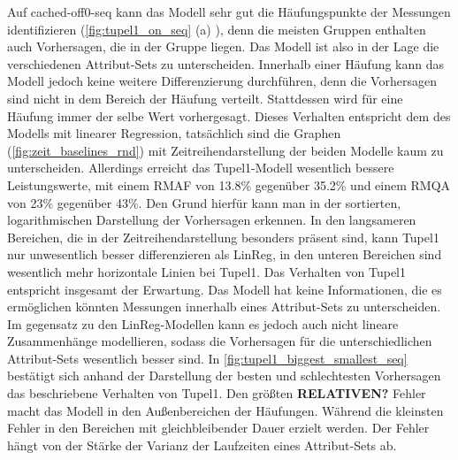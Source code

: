 \documentclass[
	12pt,
	a4paper,
	BCOR10mm,
	DIV14,
	listof=totoc,
	bibliography=totoc,
	headsepline
]{scrreprt}
\begin{document}
Auf cached-off0-seq kann das Modell sehr gut die Häufungspunkte der Messungen identifizieren (\ref{fig:tupel1_on_seq} (a) ), denn die meisten Gruppen enthalten auch Vorhersagen, die in der Gruppe liegen. Das Modell ist also in der Lage die verschiedenen Attribut-Sets zu unterscheiden. Innerhalb einer Häufung kann das Modell jedoch keine weitere Differenzierung durchführen, denn die Vorhersagen sind nicht in dem Bereich der Häufung verteilt. Stattdessen wird für eine Häufung immer der selbe Wert vorhergesagt. Dieses Verhalten entspricht dem des Modells mit linearer Regression, tatsächlich sind die Graphen (\ref{fig:zeit_baselines_rnd}) mit Zeitreihendarstellung der beiden Modelle kaum zu unterscheiden. Allerdings erreicht das Tupel1-Modell wesentlich bessere Leistungswerte, mit einem RMAF von 13.8\% gegenüber 35.2\% und einem RMQA von 23\% gegenüber 43\%.
Den Grund hierfür kann man in der sortierten, logarithmischen Darstellung der Vorhersagen erkennen. In den langsameren Bereichen, die in der Zeitreihendarstellung besonders präsent sind, kann Tupel1 nur unwesentlich besser differenzieren als LinReg, in den unteren Bereichen sind wesentlich mehr horizontale Linien bei Tupel1.
Das Verhalten von Tupel1 entspricht insgesamt der Erwartung. Das Modell hat keine Informationen, die es ermöglichen könnten Messungen innerhalb eines Attribut-Sets zu unterscheiden. Im gegensatz zu den LinReg-Modellen kann es jedoch auch nicht lineare Zusammenhänge modellieren, sodass die Vorhersagen für die unterschiedlichen Attribut-Sets wesentlich besser sind. In \ref{fig:tupel1_biggest_smallest_seq} bestätigt sich anhand der Darstellung der besten und schlechtesten Vorhersagen das beschriebene Verhalten von Tupel1. Den größten \textbf{RELATIVEN?} Fehler macht das Modell in den Außenbereichen der Häufungen. Während die kleinsten Fehler in den Bereichen mit gleichbleibender Dauer erzielt werden. Der Fehler hängt von der Stärke der Varianz der Laufzeiten eines Attribut-Sets ab.
\end{document}
